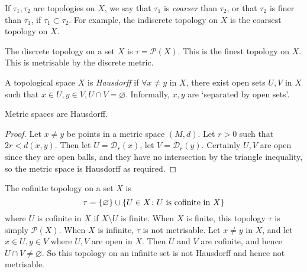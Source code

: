 \begin{definition}
	If \( \tau_1, \tau_2 \) are topologies on \( X \), we say that \( \tau_1 \) is \textit{coarser} than \( \tau_2 \), or that \( \tau_2 \) is finer than \( \tau_1 \), if \( \tau_1 \subset \tau_2 \).
	For example, the indiscrete topology on \( X \) is the coarsest topology on \( X \).
\end{definition}
\begin{example}
	The discrete topology on a set \( X \) is \( \tau = \mathcal P(X) \).
	This is the finest topology on \( X \).
	This is metrisable by the discrete metric.
\end{example}
\begin{definition}
	A topological space \( X \) is \textit{Hausdorff} if \( \forall x \neq y \) in \( X \), there exist open sets \( U, V \) in \( X \) such that \( x \in U, y \in V, U \cap V = \varnothing \).
	Informally, \( x, y \) are `separated by open sets'.
\end{definition}
\begin{proposition}
	Metric spaces are Hausdorff.
\end{proposition}
\begin{proof}
	Let \( x \neq y \) be points in a metric space \( (M, d) \).
	Let \( r > 0 \) such that \( 2r < d(x,y) \).
	Then let \( U = \mathcal D_r(x) \), let \( V = \mathcal D_r(y) \).
	Certainly \( U, V \) are open since they are open balls, and they have no intersection by the triangle inequality, so the metric space is Hausdorff as required.
\end{proof}
\begin{example}
	The cofinite topology on a set \( X \) is
	\[
		\tau = \qty{\varnothing} \cup \qty{U \in X \colon U \text{ is cofinite in } X}
	\]
	where \( U \) is cofinite in \( X \) if \( X \setminus U \) is finite.
	When \( X \) is finite, this topology \( \tau \) is simply \( \mathcal P(X) \).
	When \( X \) is infinite, \( \tau \) is not metrisable.
	Let \( x \neq y \) in \( X \), and let \( x \in U, y \in V \) where \( U, V \) are open in \( X \).
	Then \( U \) and \( V \) are cofinite, and hence \( U \cap V \neq \varnothing \).
	So this topology on an infinite set is not Hausdorff and hence not metrisable.
\end{example}

